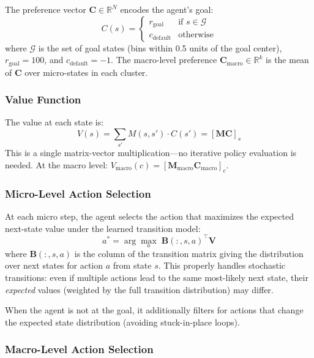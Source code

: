 \documentclass[11pt,a4paper]{article}
\newcommand{\M}{\mathbf{M}}
\newcommand{\B}{\mathbf{B}}
\newcommand{\C}{\mathbf{C}}
\newcommand{\V}{\mathbf{V}}
\newcommand{\Mmacro}{\M_{\text{macro}}}
\newcommand{\Cmacro}{\C_{\text{macro}}}
\newcommand{\R}{\mathbb{R}}
\begin{document}
The preference vector $\C \in \R^N$ encodes the agent's goal:
\begin{equation}
    C(s) = \begin{cases}
        r_{\text{goal}} & \text{if } s \in \mathcal{G} \\
        c_{\text{default}} & \text{otherwise}
    \end{cases}
\end{equation}
where $\mathcal{G}$ is the set of goal states (bins within 0.5 units of the goal center), $r_{\text{goal}} = 100$, and $c_{\text{default}} = -1$.
The macro-level preference $\Cmacro \in \R^k$ is the mean of $\C$ over micro-states in each cluster.

\subsubsection{Value Function}

The value at each state is:
\begin{equation}
    V(s) = \sum_{s'} M(s, s') \cdot C(s') = [\M \C]_s
    \label{eq:value}
\end{equation}
This is a single matrix-vector multiplication---no iterative policy evaluation is needed.
At the macro level: $V_{\text{macro}}(c) = [\Mmacro \Cmacro]_c$.

\subsubsection{Micro-Level Action Selection}

At each micro step, the agent selects the action that maximizes the expected next-state value under the learned transition model:
\begin{equation}
    a^* = \arg\max_a \; \B(:, s, a)^\top \V
    \label{eq:action_select}
\end{equation}
where $\B(:, s, a)$ is the column of the transition matrix giving the distribution over next states for action $a$ from state $s$.
This properly handles stochastic transitions: even if multiple actions lead to the same most-likely next state, their \emph{expected} values (weighted by the full transition distribution) may differ.

When the agent is not at the goal, it additionally filters for actions that change the expected state distribution (avoiding stuck-in-place loops).

\subsubsection{Macro-Level Action Selection}
\end{document}
